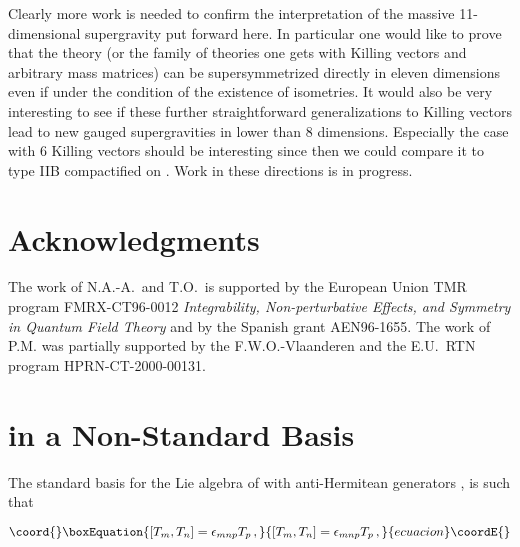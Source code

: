 \documentclass[12pt,a4paper]{article}
\begin{document}
Clearly more work is needed to confirm the interpretation of the
massive 11-dimensional supergravity put forward here. In particular
one would like to prove that the theory (or the family of theories one
gets with \coordHE{} Killing vectors and arbitrary mass matrices) can be
supersymmetrized directly in eleven dimensions even if under the
condition of the existence of \coordHE{} isometries.  It would also be very
interesting to see if these further straightforward generalizations to
\coordHE{} Killing vectors lead to new gauged supergravities in lower than 8
dimensions.  Especially the case with 6 Killing vectors should be
interesting since then we could compare it to type IIB compactified on
\coordHE{}.  Work in these directions is in progress.

\section*{Acknowledgments}

The work of N.A.-A.~and T.O.~is supported by the European Union TMR
program FMRX-CT96-0012 {\sl Integrability, Non-perturbative Effects,
  and Symmetry in Quantum Field Theory} and by the Spanish grant
AEN96-1655.  The work of P.M. was partially supported by the
F.W.O.-Vlaanderen and the E.U.~RTN program HPRN-CT-2000-00131.

\appendix
\section{\coordHE{} in a Non-Standard Basis}
\label{sec-so3}

The standard basis for the Lie algebra of \coordHE{} with anti-Hermitean
generators \coordHE{},  \coordHE{} is such that

\begin{equation}\coord{}\boxEquation{
[T_{m},T_{n}] =\epsilon_{mnp}T_{p}\, ,  
}{
[T_{m},T_{n}] =\epsilon_{mnp}T_{p}\, ,  
}{ecuacion}\coordE{}\end{equation}
\end{document}
